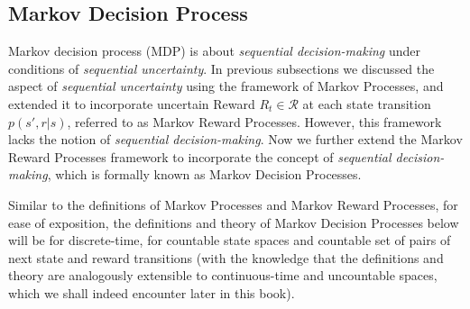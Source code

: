 \documentclass[../xlapes02]{subfiles}
\begin{document}
    \subsection{Markov Decision Process}\label{subsec:markov-decision-process}
    Markov decision process (MDP) is about \emph{sequential decision-making} under conditions of \emph{sequential uncertainty}.
    In previous subsections we discussed the aspect of \emph{sequential uncertainty} using the framework of Markov Processes, and extended it to incorporate uncertain Reward $R_t\in\mathcal{R}$ at each state transition $p(s',r|s)$, referred to as Markov Reward Processes.
    However, this framework lacks the notion of \emph{sequential decision-making}.
    Now we further extend the Markov Reward Processes framework to incorporate the concept of \emph{sequential decision-making}, which is formally known as Markov Decision Processes.


    Similar to the definitions of Markov Processes and Markov Reward Processes, for ease
    of exposition, the definitions and theory of Markov Decision Processes below will be for
    discrete-time, for countable state spaces and countable set of pairs of next state and reward
    transitions (with the knowledge that the definitions and theory are analogously extensible
    to continuous-time and uncountable spaces, which we shall indeed encounter later in this
    book).
\end{document}
